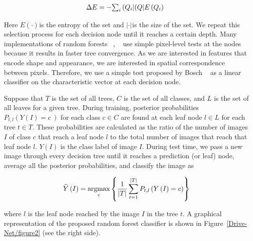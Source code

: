 \documentclass{confproc}
\begin{document}
\let\saveeqnno\theequation
\let\savefrac\frac
\def\dispfrac{\displaystyle\savefrac}
\begin{eqnarray}
\let\frac\dispfrac
\gdef\theequation{2}
\let\theHequation\theequation
\label{disp-formula-group-d27d73835da3454a817782924579e245}
\begin{array}{@{}l}\Delta E=-{\sum_i{\frac{\left(Q_i\right\vert}{\left(Q\right\vert}E\left(Q_i\right)}}\end{array}
\end{eqnarray}
\global\let\theequation\saveeqnno
\addtocounter{equation}{-1}\ignorespaces

Here $E\left(\cdot\right) $\ensuremath{_{}}is the entropy of the set and $\left\vert \cdot\right\vert $\ensuremath{_{}}is the size of the set. We repeat this selection process for each decision node until it reaches a certain depth. Many implementations of random forests \unskip~\cite{1641075:26775846}, \unskip~\cite{1641075:26775849} use simple pixel-level tests at the nodes because it results in faster tree convergence. As we are interested in features that encode shape and appearance, we are interested in spatial correspondence between pixels. Therefore, we use a simple test proposed by Bosch \unskip~\cite{1641075:26775861} {\textemdash} as a linear classifier on the characteristic vector {\textemdash} at each decision node.

Suppose that $T $ is the set of all trees, $C $ is the set of all classes, and $L $ is the set of all leaves for a given tree. During training, posterior probabilities $P_{t,l}\left(Y\left(I\right)=c\:\right) $ for each class $c\in C $ are found at each leaf node $l\in L $ for each tree $t\in T $. These probabilities are calculated as the ratio of the number of images $I $ of class $c $ that reach a leaf node $l $ to the total number of images that reach that leaf node $l $. $Y\left(I\right) $ is the class label of image $I $. During test time, we pass a new image through every decision tree until it reaches a prediction (or leaf) node, average all the posterior probabilities, and classify the image as


\begin{eqnarray}
\gdef\theequation{3}
\label{disp-formula-group-032e1395024b44bca0feeb46474c0adc}
\widehat Y\left(I\right)=\underset c{\text{argmax}}\left\{\frac1{\left\vert T\right\vert}\sum_{t=1}^{\left\vert T\right\vert}P_{t,l}\left(Y\left(I\right)=c\right)\right\}
\end{eqnarray}


where $l $ is the leaf node reached by the image $I $ in the tree $t $. A graphical representation of the proposed random forest classifier is shown in Figure~\ref{Drive-Net/figure2}  (see the right side).
\end{document}
